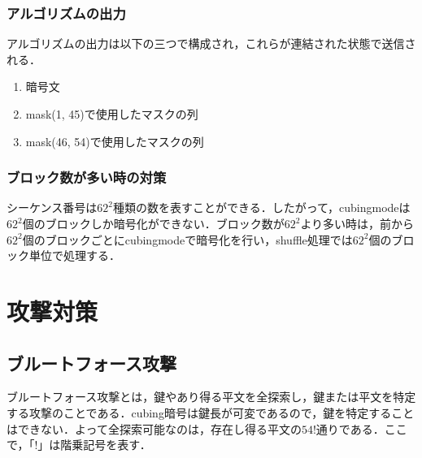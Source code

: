 \documentclass[a4j,titlepage]{jsarticle}
\begin{document}
\subsubsection{アルゴリズムの出力}
アルゴリズムの出力は以下の三つで構成され，これらが連結された状態で送信される．
\begin{screen}
  \begin{enumerate}
    \item 暗号文
    \item mask(\phantom{0}1, 45)で使用したマスクの列
    \item mask(46, 54)で使用したマスクの列
  \end{enumerate}
\end{screen}

\subsubsection{ブロック数が多い時の対策}
シーケンス番号は\(62^2\)種類の数を表すことができる．したがって，cubingmodeは\(62^2\)個のブロックしか暗号化ができない．ブロック数が\(62^2\)より多い時は，前から\(62^2\)個のブロックごとにcubingmodeで暗号化を行い，shuffle処理では\(62^2\)個のブロック単位で処理する．

\section{攻撃対策}
\subsection{ブルートフォース攻撃}
ブルートフォース攻撃とは，鍵やあり得る平文を全探索し，鍵または平文を特定する攻撃のことである．cubing暗号は鍵長が可変であるので，鍵を特定することはできない．よって全探索可能なのは，存在し得る平文の\(54!\)通りである．ここで，「\(!\)」は階乗記号を表す．
\end{document}

